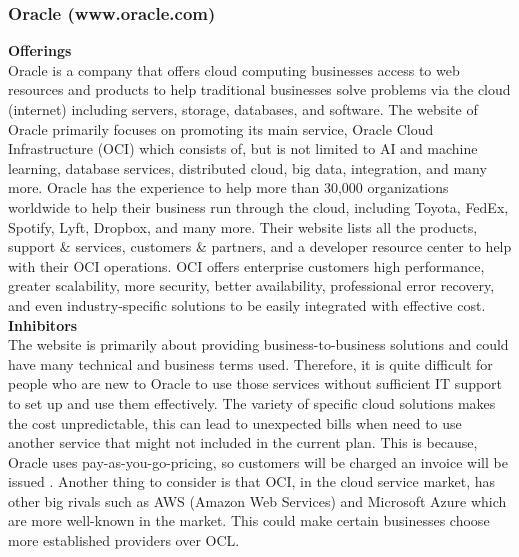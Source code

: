 \documentclass[12pt,a4paper]{article}
\begin{document}
\subsubsection{Oracle (www.oracle.com)} 
\noindent\textbf{Offerings}\\
\noindent Oracle is a company that offers cloud computing businesses access to web resources and products to help traditional businesses solve problems via the cloud (internet) including servers, storage, databases, and software. The website of Oracle primarily focuses on promoting its main service, Oracle Cloud Infrastructure (OCI) which consists of, but is not limited to AI and machine learning, database services, distributed cloud, big data, integration, and many more. Oracle has the experience to help more than 30,000 organizations worldwide to help their business run through the cloud, including Toyota, FedEx, Spotify, Lyft, Dropbox, and many more. Their website lists all the products, support \& services, customers \& partners, and a developer resource center to help with their OCI operations. OCI offers enterprise customers high performance, greater scalability, more security, better availability, professional error recovery, and even industry-specific solutions to be easily integrated with effective cost.\\
 
\noindent\textbf{Inhibitors}\\
\noindent The website is primarily about providing business-to-business solutions and could have many technical and business terms used. Therefore, it is quite difficult for people who are new to Oracle to use those services without sufficient IT support to set up and use them effectively. The variety of specific cloud solutions makes the cost unpredictable, this can lead to unexpected bills when need to use another service that might not included in the current plan. This is because, Oracle uses pay-as-you-go-pricing, so customers will be charged an invoice will be issued \citep{question_3.3}. Another thing to consider is that OCI, in the cloud service market, has other big rivals such as AWS (Amazon Web Services) and Microsoft Azure which are more well-known in the market. This could make certain businesses choose more established providers over OCL.\\
\end{document}
